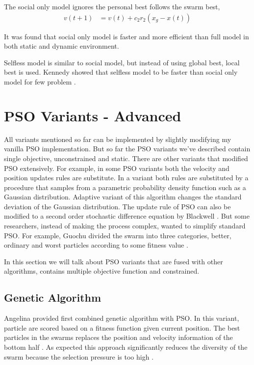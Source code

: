 \documentclass{article}
\begin{document}
The social only model ignores the personal best follows the swarm best,
\begin{align*}
v(t+1) &= v(t) + c_2r_2(x_g - x(t)) 
\end{align*}

It was found that social only model is faster and more efficient than full model in both static and dynamic environment. \cite{kennedy1997particle, carlisle2000adapting}

Selfless model is similar to social model, but instead of using global best, local best is used. Kennedy showed that selfless model to be faster than social only model for few problem \cite{kennedy1997particle}.

\section{PSO Variants - Advanced}
All variants mentioned so far can be implemented by slightly modifying my vanilla PSO implementation. But so far the PSO variants we've described contain single objective, unconstrained and static. There are other variants that modified PSO extensively. For example, in some PSO variants both the velocity and position updates rules are substitute. In a variant both rules are substituted by a procedure that samples from a parametric probability density function such as a Gaussian distribution. Adaptive variant of this algorithm changes the standard deviation of the Gaussian distribution. The update rule of PSO can also be modified to a second order stochastic difference equation by Blackwell \cite{blackwell2011study}. But some researchers, instead of making the process complex, wanted to simplify standard PSO. For example, Guochu divided the swarm into three categories, better, ordinary and worst particles according to some fitness value \cite{chen2010simplified}.

In this section we will talk about PSO variants that are fused with other algorithms, contains multiple objective function and constrained.

\subsection{Genetic Algorithm}
Angelina provided first combined genetic algorithm with PSO. In this variant, particle are scored based on a fitness function given current position. The best particles in the swarms replaces the position and velocity information of the bottom half \cite{angeline1998using}. As expected this approach significantly reduces the diversity of the swarm because the selection pressure is too high \cite{higashi2003particle}.
\end{document}
